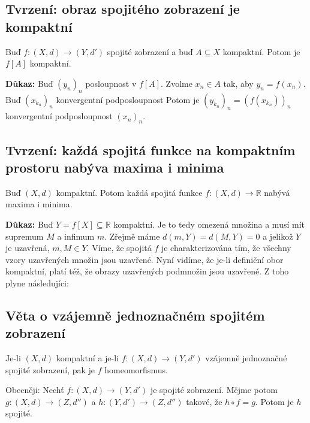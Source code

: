\documentclass[10pt]{article}
\begin{document}
\subsection{Tvrzení: obraz spojitého zobrazení je kompaktní}
\hspace{1.2mm}
\noindent
Buď $f: (X,d) \to (Y, d')$ spojité zobrazení a buď $A \subseteq X$ kompaktní. Potom je $f[A]$ kompaktní.


\vspace{5mm}
\noindent
\textbf{Důkaz:} Buď $(y_n)_n$ posloupnost v $f[A]$. Zvolme $x_n \in A$ tak, aby $y_n = f(x_n)$. Buď $(x_{k_n})_n$ konvergentní podposloupnost
Potom je $(y_{k_n})_n = (f(x_{k_n}))_n$ konvergentní podposloupnost $(x_n)_n$.

\subsection{Tvrzení: každá spojitá funkce na kompaktním prostoru nabýva maxima i minima}
\hspace{1.2mm}
\noindent
Buď $(X,d)$ kompaktní. Potom každá spojitá funkce $f:(X,d)\to \mathbb{R}$ nabývá maxima i minima.

\vspace{5mm}
\noindent
\textbf{Důkaz:} Buď $Y = f[X] \subseteq \mathbb{R}$ kompaktní. Je to tedy omezená množina a musí mít supremum $M$ a infimum $m$. Zřejmě máme 
$d(m,Y) = d(M,Y) = 0$ a jelikož $Y$ je uzavřená, $m,M \in Y$. Víme, že spojitá $f$ je charakterizována tím, že všechny vzory uzavřených množin
jsou uzavřené. Nyní vidíme, že je-li definiční obor kompaktní, platí též, že obrazy uzavřených podmnožin jsou uzavřené. Z toho plyne následujíci:

\subsection{Věta o vzájemně jednoznačném spojitém zobrazení}
\hspace{1.2mm}
\noindent
Je-li $(X,d)$ kompaktní a je-li $f: (X,d) \to (Y,d')$ vzájemně jednoznačné spojité zobrazení, pak je
$f$ homeomorfismus.

\vspace{2mm}
\hspace{1.2mm}
{\small
Obecněji: Nechť $f:(X,d) \to (Y,d')$ je spojité zobrazení. Mějme potom $g: (X,d) \to (Z, d'')$ a
$h: (Y,d') \to (Z,d'')$ takové, že $h \circ f = g$. Potom je $h$ spojité.}
\end{document}
